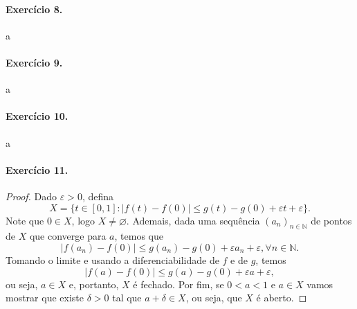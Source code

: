 \documentclass[12pt,a4paper]{article}
\newcommand{\N}{\mathbb{N}}
\begin{document}
\paragraph{Exercício 8.}
    a
\paragraph{Exercício 9.}
    a
\paragraph{Exercício 10.}
    a
\paragraph{Exercício 11.}
    \begin{proof}
        Dado $\varepsilon > 0$, defina
        \begin{equation*}
            X = \{ t\in [0,1] : |f(t) - f(0)| \leq g(t) - g(0) + 
                                              \varepsilon t + \varepsilon \}.
        \end{equation*}
        Note que $0\in X$, logo $X\neq\varnothing$. Ademais, dada uma sequência
        $(a_n)_{n\in\N}$ de pontos de $X$ que converge para $a$, temos que
        \begin{equation*}
            |f(a_n) - f(0)| \leq g(a_n) - g(0) + \varepsilon a_n + \varepsilon, 
            \forall n\in\N.
        \end{equation*}
        Tomando o limite e usando a diferenciabilidade de $f$ e de $g$, temos
        \begin{equation*}
            |f(a) - f(0)| \leq g(a) - g(0) + \varepsilon a + \varepsilon,
        \end{equation*}
        ou seja, $a\in X$ e, portanto, $X$ é fechado. Por fim, se
        $0 < a < 1$ e $a\in X$ vamos mostrar que existe $\delta > 0$
        tal que $a + \delta \in X$, ou seja, que $X$ é aberto.
    \end{proof}
\end{document}
